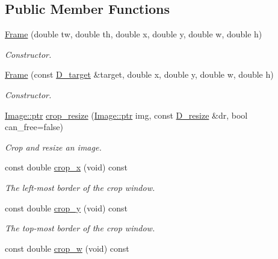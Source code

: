 \subsection*{Public Member Functions}
\begin{DoxyCompactItemize}
\item 
\hyperlink{class_photo_finish_1_1_frame_a40b62f1f9f5b963ed7a39cd267352a84}{Frame} (double tw, double th, double x, double y, double w, double h)
\begin{DoxyCompactList}\small\item\em Constructor. \end{DoxyCompactList}\item 
\hyperlink{class_photo_finish_1_1_frame_aa6d461d604692d65cfe8dab624b86577}{Frame} (const \hyperlink{class_photo_finish_1_1_d__target}{D\+\_\+target} \&target, double x, double y, double w, double h)
\begin{DoxyCompactList}\small\item\em Constructor. \end{DoxyCompactList}\item 
\hyperlink{class_photo_finish_1_1_image_ab336203305ed3a1397d7245063353b5a}{Image\+::ptr} \hyperlink{class_photo_finish_1_1_frame_ae0c41ae4e50f1fb0c9b80ae7c3ef0765}{crop\+\_\+resize} (\hyperlink{class_photo_finish_1_1_image_ab336203305ed3a1397d7245063353b5a}{Image\+::ptr} img, const \hyperlink{class_photo_finish_1_1_d__resize}{D\+\_\+resize} \&dr, bool can\+\_\+free=false)
\begin{DoxyCompactList}\small\item\em Crop and resize an image. \end{DoxyCompactList}\item 
const double \hyperlink{class_photo_finish_1_1_frame_af7fdd897762412a9d8dcfc309a0bd61a}{crop\+\_\+x} (void) const
\begin{DoxyCompactList}\small\item\em The left-\/most border of the crop window. \end{DoxyCompactList}\item 
const double \hyperlink{class_photo_finish_1_1_frame_afc570fbabb63837f104211f3102e70fd}{crop\+\_\+y} (void) const
\begin{DoxyCompactList}\small\item\em The top-\/most border of the crop window. \end{DoxyCompactList}\item 
const double \hyperlink{class_photo_finish_1_1_frame_a14195ec4f0fb7d0bc5ae1ec855f35ef5}{crop\+\_\+w} (void) const

\end{DoxyCompactItemize}
